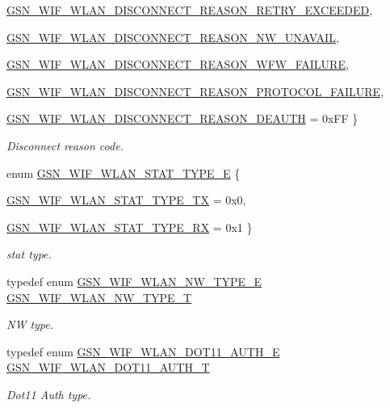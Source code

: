 \begin{DoxyCompactItemize}
\par
\hyperlink{a00640_gga9dd854d0108dc49ff077a04e897e3518acd39138402c119334dd5f6b3a18ee9c5}{GSN\_\-WIF\_\-WLAN\_\-DISCONNECT\_\-REASON\_\-RETRY\_\-EXCEEDED}, 
\par
\hyperlink{a00640_gga9dd854d0108dc49ff077a04e897e3518a969801072b56d9aa2eb6298b7d79d6fd}{GSN\_\-WIF\_\-WLAN\_\-DISCONNECT\_\-REASON\_\-NW\_\-UNAVAIL}, 
\par
\hyperlink{a00640_gga9dd854d0108dc49ff077a04e897e3518a6e04b4bfeb58c31b2b515f7919275cba}{GSN\_\-WIF\_\-WLAN\_\-DISCONNECT\_\-REASON\_\-WFW\_\-FAILURE}, 
\par
\hyperlink{a00640_gga9dd854d0108dc49ff077a04e897e3518ae0b2465fb829477650a95f708deff7fe}{GSN\_\-WIF\_\-WLAN\_\-DISCONNECT\_\-REASON\_\-PROTOCOL\_\-FAILURE}, 
\par
\hyperlink{a00640_gga9dd854d0108dc49ff077a04e897e3518aedf74ad09bfdcfc5b39c5a36afe860df}{GSN\_\-WIF\_\-WLAN\_\-DISCONNECT\_\-REASON\_\-DEAUTH} = 0xFF
 \}
\begin{DoxyCompactList}\small\item\em Disconnect reason code. \end{DoxyCompactList}\item 
enum \hyperlink{a00677_ga1ea7ef2124a3ae886d909d6b8188ef79}{GSN\_\-WIF\_\-WLAN\_\-STAT\_\-TYPE\_\-E} \{ \par
\hyperlink{a00640_gga1ea7ef2124a3ae886d909d6b8188ef79a04b02ff9d7f0704e049d050172be3433}{GSN\_\-WIF\_\-WLAN\_\-STAT\_\-TYPE\_\-TX} =  0x0, 
\par
\hyperlink{a00640_gga1ea7ef2124a3ae886d909d6b8188ef79a9b06475a178a05d5fea8e190e34e8e08}{GSN\_\-WIF\_\-WLAN\_\-STAT\_\-TYPE\_\-RX} =  0x1
 \}
\begin{DoxyCompactList}\small\item\em stat type. \end{DoxyCompactList}\item 
typedef enum \hyperlink{a00677_ga4d89b2a0c901a8c766f195897f16623f}{GSN\_\-WIF\_\-WLAN\_\-NW\_\-TYPE\_\-E} \hyperlink{a00677_gabc852e0cb262314c5f307a3e9802921e}{GSN\_\-WIF\_\-WLAN\_\-NW\_\-TYPE\_\-T}
\begin{DoxyCompactList}\small\item\em NW type. \end{DoxyCompactList}\item 
typedef enum \hyperlink{a00677_ga5415d31a2d60b731af07dc04240e540c}{GSN\_\-WIF\_\-WLAN\_\-DOT11\_\-AUTH\_\-E} \hyperlink{a00677_gaa550b3e9decb3a2585cb801dde9e5609}{GSN\_\-WIF\_\-WLAN\_\-DOT11\_\-AUTH\_\-T}
\begin{DoxyCompactList}\small\item\em Dot11 Auth type. \end{DoxyCompactList}\item 

\end{DoxyCompactItemize}
